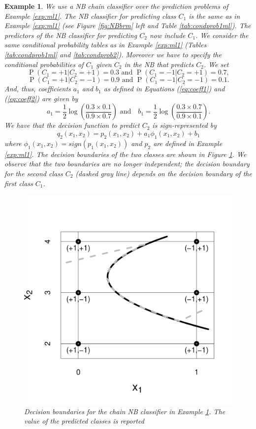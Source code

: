 \documentclass[11pt,a4paper, twoside]{book}
\newtheorem{example}{Example}[chapter]
\newcommand{\Pp}{\operatorname{P}}
\begin{document}
\begin{example}
\label{exp:ml2}
We use a NB chain classifier over the prediction problems of Example \ref{exp:ml1}. The NB classifier for predicting class $C_1$ is the same as in Example \ref{exp:ml1} (see Figure \ref{fig:NBbrm} left and Table \ref{tab:condprob1ml}). The predictors of the NB classifier for predicting $C_2$ now include $C_1$. We consider the same conditional probability tables as in Example \ref{exp:ml1} (Tables \ref{tab:condprob1ml} and \ref{tab:condprob2}). Moreover we have to specify the conditional probabilities of $C_1$ given $C_2$ in the NB that predicts $C_2$. We set
\[ \Pp(C_1=+1|C_2=+1)=0.3 \text{ and } \Pp(C_1=-1|C_2=+1)=0.7,  \]
\[ \Pp(C_1=+1|C_2=-1)=0.9 \text{ and } \Pp(C_1=-1|C_2=-1)=0.1.  \]
And, thus, coefficients $a_1$ and $b_1$ as defined in Equations (\ref{eq:coeff1}) and (\ref{eq:coeff2}) are given by
\[ a_1=\frac{1}{2}\log \left( \frac{0.3 \times 0.1}{0.9\times0.7} \right) \text{ and} \quad
 b_1=\frac{1}{2}\log \left( \frac{0.3\times0.7}{0.9\times0.1} \right).\]
We have that the decision function to predict $C_2$ is sign-represented by
\[ {q_2(x_1,x_2)=p_2(x_1,x_2) + a_1 \phi_{1}(x_1,x_2)+b_1 }\]
{where $\phi_1(x_1,x_2)=sign(p_1(x_1,x_2))$ and $p_2$ are defined in Example \ref{exp:ml1}.
The decision boundaries of the two classes are shown in Figure \ref{fig:NBchain1}.} We observe that the two boundaries are no longer independent; the decision boundary for the second class $C_2$ (dashed gray line) depends on the decision boundary of the first class $C_1$.
\begin{figure}[h!]
\centering
\includegraphics[scale=0.5]{ExampleChain}
\caption{Decision boundaries for the chain NB classifier in Example \ref{exp:ml2}. The value of the predicted classes is reported}
\label{fig:NBchain1}
\end{figure}
\end{example}
\end{document}
